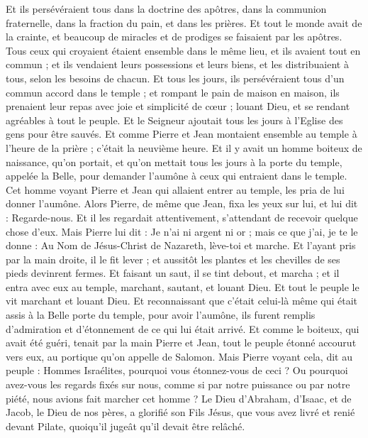 \begin{multicols}{2}
Et ils persévéraient tous dans la doctrine des apôtres, dans la communion fraternelle, dans la fraction du pain, et dans les prières.
Et tout le monde avait de la crainte, et beaucoup de miracles et de prodiges se faisaient par les apôtres.
Tous ceux qui croyaient étaient ensemble dans le même lieu, et ils avaient tout en commun ;
et ils vendaient leurs possessions et leurs biens, et les distribuaient à tous, selon les besoins de chacun.
Et tous les jours, ils persévéraient tous d'un commun accord dans le temple ; et rompant le pain de maison en maison, ils prenaient leur repas avec joie et simplicité de cœur ;
louant Dieu, et se rendant agréables à tout le peuple. Et le Seigneur ajoutait tous les jours à l'Eglise des gens pour être sauvés.
\VerseOne{}Et comme Pierre et Jean montaient ensemble au temple à l'heure de la prière ; c'était la neuvième heure.
Et il y avait un homme boiteux de naissance, qu'on portait, et qu'on mettait tous les jours à la porte du temple, appelée la Belle, pour demander l'aumône à ceux qui entraient dans le temple. 
Cet homme voyant Pierre et Jean qui allaient entrer au temple, les pria de lui donner l'aumône.
Alors Pierre, de même que Jean, fixa les yeux sur lui, et lui dit : Regarde-nous.
Et il les regardait attentivement, s'attendant de recevoir quelque chose d'eux.
Mais Pierre lui dit : Je n'ai ni argent ni or ; mais ce que j'ai, je te le donne : Au Nom de Jésus-Christ de Nazareth, lève-toi et marche.
Et l'ayant pris par la main droite, il le fit lever ; et aussitôt les plantes et les chevilles de ses pieds devinrent fermes.
Et faisant un saut, il se tint debout, et marcha ; et il entra avec eux au temple, marchant, sautant, et louant Dieu.
Et tout le peuple le vit marchant et louant Dieu.
Et reconnaissant que c'était celui-là même qui était assis à la Belle porte du temple, pour avoir l'aumône, ils furent remplis d'admiration et d'étonnement de ce qui lui était arrivé.
Et comme le boiteux, qui avait été guéri, tenait par la main Pierre et Jean, tout le peuple étonné accourut vers eux, au portique qu'on appelle de Salomon.
Mais Pierre voyant cela, dit au peuple : Hommes Israélites, pourquoi vous étonnez-vous de ceci ? Ou pourquoi avez-vous les regards fixés sur nous, comme si par notre puissance ou par notre piété, nous avions fait marcher cet homme ?
Le Dieu d'Abraham, d'Isaac, et de Jacob, le Dieu de nos pères, a glorifié son Fils Jésus, que vous avez livré et renié devant Pilate, quoiqu'il jugeât qu'il devait être relâché.

\end{multicols}
